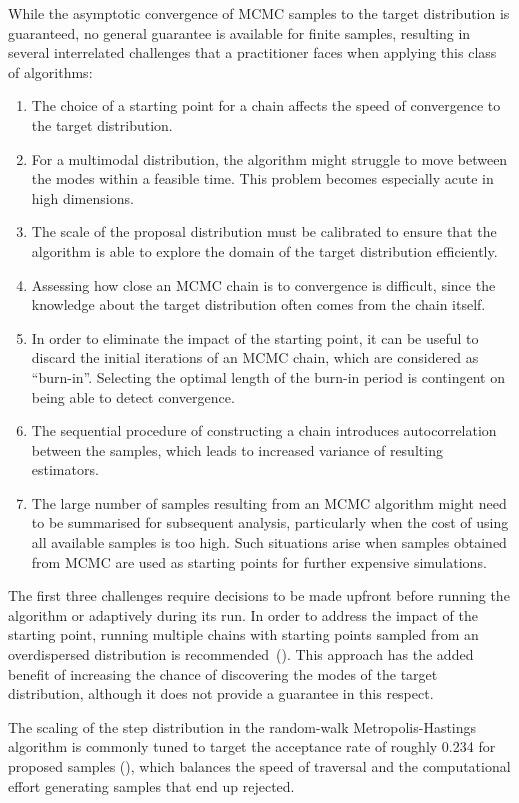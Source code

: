 \documentclass[11pt,a4paper]{report}
\begin{document}
While the asymptotic convergence of MCMC samples to the target distribution is guaranteed, no general guarantee is available for finite samples, resulting in several interrelated challenges that a practitioner faces when applying this class of algorithms:
\begin{enumerate}
\item The choice of a starting point for a chain affects the speed of convergence to the target distribution.
\item For a multimodal distribution, the algorithm might struggle to move between the modes within a feasible time. This problem becomes especially acute in high dimensions.
\item The scale of the proposal distribution must be calibrated to ensure that the algorithm is able to explore the domain of the target distribution efficiently.
\item Assessing how close an MCMC chain is to convergence is difficult, since the knowledge about the target distribution often comes from the chain itself.
\item In order to eliminate the impact of the starting point, it can be useful to discard the initial iterations of an MCMC chain, which are considered as ``burn-in''. Selecting the optimal length of the burn-in period is contingent on being able to detect convergence.
\item The sequential procedure of constructing a chain introduces autocorrelation between the samples, which leads to increased variance of resulting estimators.
\item The large number of samples resulting from an MCMC algorithm might need to be summarised for subsequent analysis, particularly when the cost of using all available samples is too high. Such situations arise when samples obtained from MCMC are used as starting points for further expensive simulations.
\end{enumerate}

The first three challenges require decisions to be made upfront before running the algorithm or adaptively during its run. In order to address the impact of the starting point, running multiple chains with starting points sampled from an overdispersed distribution is recommended~(\cite{gelmanInferenceIterativeSimulation1992}). This approach has the added benefit of increasing the chance of discovering the modes of the target distribution, although it does not provide a guarantee in this respect. 

The scaling of the step distribution in the random-walk Metropolis-Hastings algorithm is commonly tuned to target the acceptance rate of roughly 0.234 for proposed samples (\cite{gelmanEfficientMetropolisJumping1996,gelmanWeakConvergenceOptimal1997,robertsOptimalScalingVarious2001}), which balances the speed of traversal and the computational effort generating samples that end up rejected.
\end{document}
